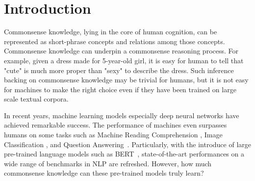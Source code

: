 \section{Introduction}

Commonsense knowledge, lying in the core of human cognition,
can be represented as short-phrase concepts and relations among those concepts. 
Commonsense knowledge can underpin a commonsense reasoning process. 
For example, given a dress made for 5-year-old girl, it is easy for human to tell that "cute" is much more proper than "sexy" to describe the dress.
Such inference backing on commonsense knowledge may be trivial for humans, 
but it is not easy for %
machines to make the right choice even if they have been trained on large scale textual corpora.


In recent years, 
machine learning models especially deep neural networks have achieved remarkable success. 
The performance of machines even surpasses humans on some tasks
such as Machine Reading Comprehension \cite{he2018dureader,rajpurkar2016squad,lai2017race} 
, Image Classification \cite{rajpurkar2017chexnet,deng2009imagenet}
, and Question Answering~\cite{reddy2019coqa}.
Particularly, with the introduce of large pre-trained language models such as BERT~\cite{devlin2018bert}, 
state-of-the-art performances on a wide range of benchmarks in NLP are refreshed.
However, %
how much commonsense knowledge can these pre-trained models truly learn?

